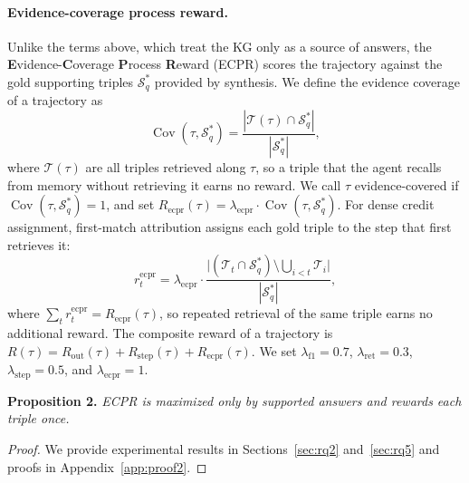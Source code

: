 \paragraph{Evidence-coverage process reward.}
Unlike the terms above, which treat the KG only as a source of answers, the \textbf{E}vidence-\textbf{C}overage \textbf{P}rocess \textbf{R}eward (ECPR) scores the trajectory against the gold supporting triples $\mathcal{S}^{*}_{q}$ provided by synthesis. We define the evidence coverage of a trajectory as
\begin{equation}
\label{eq:cov}
    \operatorname{Cov}(\tau,\mathcal{S}^{*}_{q})
    =
    \frac{
    |\mathcal{T}(\tau)\cap \mathcal{S}^{*}_{q}|
    }{
    |\mathcal{S}^{*}_{q}|
    },
\end{equation}
where $\mathcal{T}(\tau)$ are all triples retrieved along $\tau$, so a triple that the agent recalls from memory without retrieving it earns no reward. We call $\tau$ evidence-covered if $\operatorname{Cov}(\tau,\mathcal{S}^{*}_{q})=1$, and set $R_{\text{ecpr}}(\tau)=\lambda_{\text{ecpr}}\cdot\operatorname{Cov}(\tau,\mathcal{S}^{*}_{q})$. For dense credit assignment, first-match attribution assigns each gold triple to the step that first retrieves it:
\begin{equation}
    r^{\text{ecpr}}_{t}
    =
    \lambda_{\text{ecpr}}
    \cdot
    \frac{
    \bigl|(\mathcal{T}_t\cap \mathcal{S}^{*}_{q})\setminus \bigcup_{i<t}\mathcal{T}_i\bigr|
    }{
    |\mathcal{S}^{*}_{q}|
    },
\end{equation}
where $\sum_{t} r^{\text{ecpr}}_{t}=R_{\text{ecpr}}(\tau)$, so repeated retrieval of the same triple earns no additional reward. The composite reward of a trajectory is $R(\tau)=R_{\text{out}}(\tau)+R_{\text{step}}(\tau)+R_{\text{ecpr}}(\tau)$. We set $\lambda_{\text{f1}}=0.7$, $\lambda_{\text{ret}}=0.3$, $\lambda_{\text{step}}=0.5$, and $\lambda_{\text{ecpr}}=1$.

\noindent\textbf{Proposition 2.} \textit{ECPR is maximized only by supported answers and rewards each triple once.}\vspace{-2mm}
\begin{proof}\renewcommand{\qedsymbol}{}
We provide experimental results in Sections~\ref{sec:rq2} and~\ref{sec:rq5} and proofs in Appendix~\ref{app:proof2}.
\end{proof}

